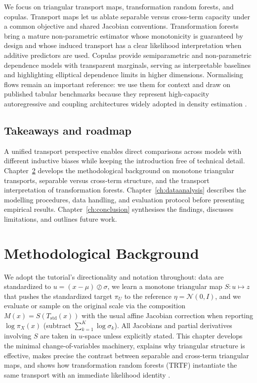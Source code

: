 \documentclass[11pt,a4paper,twoside]{book}\usepackage[]{graphicx}\usepackage[]{xcolor}
\begin{document}
We focus on triangular transport maps, transformation random forests, and copulas. Transport maps let us ablate separable versus cross-term capacity under a common objective and shared Jacobian conventions. Transformation forests bring a mature non-parametric estimator whose monotonicity is guaranteed by design and whose induced transport has a clear likelihood interpretation when additive predictors are used. Copulas provide semiparametric and non-parametric dependence models with transparent marginals, serving as interpretable baselines and highlighting elliptical dependence limits in higher dimensions. Normalising flows remain an important reference: we use them for context and draw on published tabular benchmarks because they represent high-capacity autoregressive and coupling architectures widely adopted in density estimation \citep{rezende2015variational,dinh2017real,papamakarios2021normalizing}.

\section{Takeaways and roadmap}

A unified transport perspective enables direct comparisons across models with different inductive biases while keeping the introduction free of technical detail. Chapter~\ref{ch:background} develops the methodological background on monotone triangular transports, separable versus cross-term structure, and the transport interpretation of transformation forests. Chapter~\ref{ch:dataanalysis} describes the modelling procedures, data handling, and evaluation protocol before presenting empirical results. Chapter~\ref{ch:conclusion} synthesises the findings, discusses limitations, and outlines future work.






\chapter{Methodological Background}\label{ch:background}

We adopt the tutorial's directionality and notation throughout: data are standardized to $u=(x-\mu)\oslash\sigma$, we learn a monotone triangular map $S:u\mapsto z$ that pushes the standardized target $\pi_U$ to the reference $\eta=\mathcal{N}(0,I)$, and we evaluate or sample on the original scale via the composition $M(x)=S(T_{\mathrm{std}}(x))$ with the usual affine Jacobian correction when reporting $\log \pi_X(x)$ (subtract $\sum_{k=1}^K \log \sigma_k$). All Jacobians and partial derivatives involving $S$ are taken in $u$-space unless explicitly stated. This chapter develops the minimal change-of-variables machinery, explains why triangular structure is effective, makes precise the contrast between separable and cross-term triangular maps, and shows how transformation random forests (TRTF) instantiate the same transport with an immediate likelihood identity \citep{rosenblatt1952remarks,knothe1957contributions,hothorn2017transformation,hothorn2021transformation,hothorn2018conditional,ramgraber2025friendly}.
\end{document}
